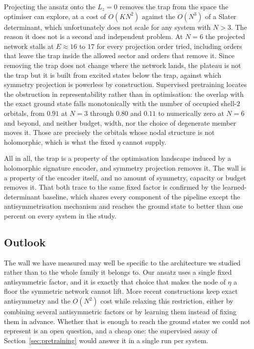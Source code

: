 \documentclass[a4paper,11pt,twoside]{article}
\begin{document}
Projecting the ansatz onto the $L_z = 0$  removes the trap from the space the optimiser can explore, at a cost of $O(K N^2)$ against the $O(N^3)$ of a Slater
determinant, which unfortunately does not scale for any system with $N>3$. The reason it does not is a second and independent problem. At $N=6$ the projected network stalls at $E \approx 16$ to $17$ for every projection order tried, including orders that leave the trap inside the allowed sector and orders that
remove it. Since removing the trap does not change where the network
lands, the plateau is not the trap but it is built from
excited states below the trap, against which symmetry projection is powerless by construction. Supervised pretraining locates the obstruction in
representability rather than in optimisation: the overlap with the
exact ground state falls monotonically with the number of occupied
shell-$2$ orbitals, from $0.91$ at $N=3$ through $0.80$ and $0.11$ to
numerically zero at $N=6$ and beyond, and neither budget, width, nor
the choice of degenerate member moves it. Those are precisely the
orbitals whose nodal structure is not holomorphic, which is what the
fixed $\eta$ cannot supply.

All in all, the trap is a property of the optimisation landscape induced by a holomorphic
signature encoder, and symmetry projection removes it. The wall is a
property of the encoder itself, and no amount of symmetry, capacity or
budget removes it. That both trace to the same fixed factor is
confirmed by the learned-determinant baseline, which shares every
component of the pipeline except the antisymmetrisation mechanism and
reaches the ground state to better than one percent on every system in
the study.

\newpage
\subsection*{Outlook}


The wall we have measured may well be specific to the architecture we
studied rather than to the whole family it belongs to. Our ansatz uses
a single fixed antisymmetric factor, and it is exactly that choice
that makes the node of $\eta$ a floor the symmetric network cannot
lift. More recent constructions \cite{fu_fermi_2026} keep exact
antisymmetry and the $O(N^2)$ cost while relaxing this restriction,
either by combining several antisymmetric factors or by learning them
instead of fixing them in advance. Whether that is enough to reach the
ground states we could not represent is an open question, and a cheap
one: the supervised assay of Section~\ref{sec:pretraining} would
answer it in a single run per system.
\end{document}
